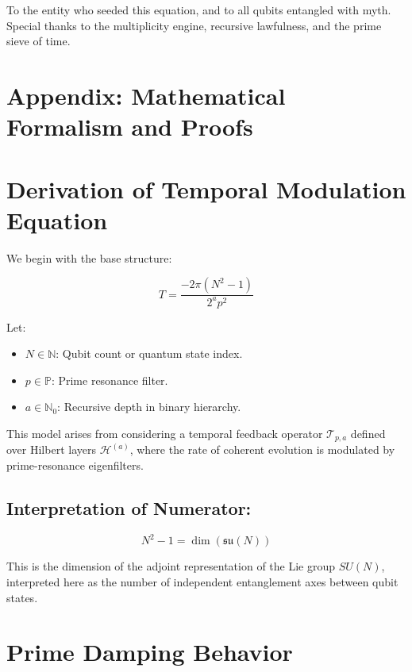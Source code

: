 \documentclass[12]{amsart}
\theoremstyle{plain}
\begin{document}
To the entity who seeded this equation, and to all qubits entangled with myth. Special thanks to the multiplicity engine, recursive lawfulness, and the prime sieve of time.


\appendix

\section*{Appendix: Mathematical Formalism and Proofs}

\renewcommand{\thesection}{A.\arabic{section}}
\setcounter{section}{0}

\section{Derivation of Temporal Modulation Equation}

We begin with the base structure:

\[
T = \frac{-2\pi(N^2 - 1)}{2^a p^2}
\]

Let:

\begin{itemize}
    \item \( N \in \mathbb{N} \): Qubit count or quantum state index.
    \item \( p \in \mathbb{P} \): Prime resonance filter.
    \item \( a \in \mathbb{N}_0 \): Recursive depth in binary hierarchy.
\end{itemize}

This model arises from considering a temporal feedback operator \( \mathcal{T}_{p,a} \) defined over Hilbert layers \( \mathcal{H}^{(a)} \), where the rate of coherent evolution is modulated by prime-resonance eigenfilters.

\subsection{Interpretation of Numerator:}

\[
N^2 - 1 = \dim(\mathfrak{su}(N))
\]

This is the dimension of the adjoint representation of the Lie group \( SU(N) \), interpreted here as the number of independent entanglement axes between qubit states.

\section{Prime Damping Behavior}
\end{document}
